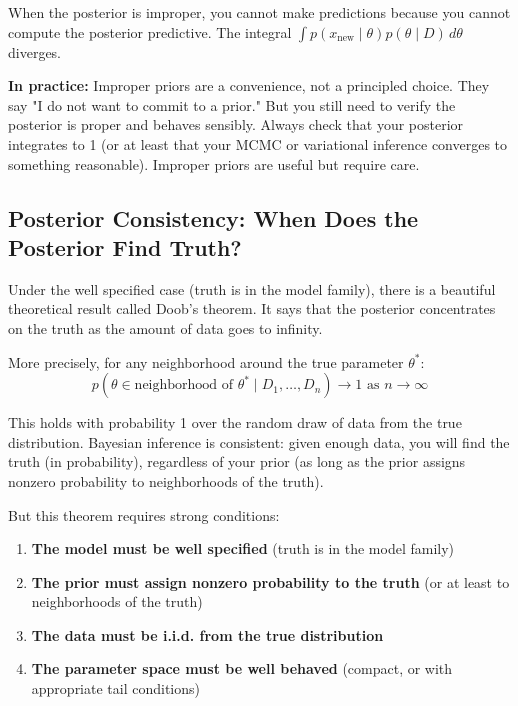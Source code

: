 When the posterior is improper, you cannot make predictions because you cannot compute the posterior predictive. The integral $\int p(x_{\text{new}} \mid \theta) p(\theta \mid D) \, d\theta$ diverges.

\textbf{In practice:} Improper priors are a convenience, not a principled choice. They say "I do not want to commit to a prior." But you still need to verify the posterior is proper and behaves sensibly. Always check that your posterior integrates to 1 (or at least that your MCMC or variational inference converges to something reasonable). Improper priors are useful but require care.

\subsection{Posterior Consistency: When Does the Posterior Find Truth?}

Under the well specified case (truth is in the model family), there is a beautiful theoretical result called Doob's theorem. It says that the posterior concentrates on the truth as the amount of data goes to infinity.

More precisely, for any neighborhood around the true parameter $\theta^*$:
\begin{equation}
p(\theta \in \text{neighborhood of } \theta^* \mid D_1, \ldots, D_n) \to 1 \text{ as } n \to \infty
\end{equation}

This holds with probability 1 over the random draw of data from the true distribution. Bayesian inference is consistent: given enough data, you will find the truth (in probability), regardless of your prior (as long as the prior assigns nonzero probability to neighborhoods of the truth).

But this theorem requires strong conditions:

\begin{enumerate}
\item \textbf{The model must be well specified} (truth is in the model family)
\item \textbf{The prior must assign nonzero probability to the truth} (or at least to neighborhoods of the truth)
\item \textbf{The data must be i.i.d. from the true distribution}
\item \textbf{The parameter space must be well behaved} (compact, or with appropriate tail conditions)
\end{enumerate}

